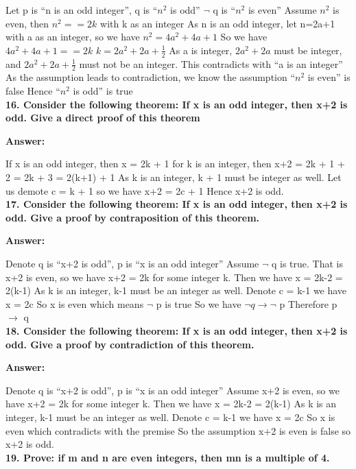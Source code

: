 \documentclass{article}
\begin{document}
\begin{large}
Let p is ``n is an odd integer'', q is ``$n^2$ is odd''
$\lnot$ q is ``$n^2$ is even''
Assume $n^2$ is even, then $n^2 == 2k$ with k as an integer
As n is an odd integer, let n=2a+1 with a as an integer, so we have $n^2 = 4a^2 + 4a + 1$
So we have $4a^2 + 4a + 1 == 2k$
$k = 2a^2 + 2a + \frac{1}{2}$
As a is integer, $2a^2 + 2a$ must be integer, and $2a^2 + 2a + \frac{1}{2}$ must not be an integer.
This contradicts with ``a is an integer''
As the assumption leads to contradiction, we know the assumption ``$n^2$ is even'' is false
Hence ``$n^2$ is odd'' is true\\

\textbf{16. Consider the following theorem: If x is an odd integer, then x+2 is odd. Give a direct proof of this theorem}

\textbf{Answer:}

If x is an odd integer, then x = 2k + 1 for k is an integer, then x+2 = 2k + 1 + 2 = 2k + 3 = 2(k+1) + 1
As k is an integer, k + 1 must be integer as well. Let us demote c = k + 1 so we have x+2 = 2c + 1
Hence x+2 is odd.\\

\textbf{17. Consider the following theorem: If x is an odd integer, then x+2 is odd. Give a proof by contraposition of this theorem.}

\textbf{Answer:}

Denote q is ``x+2 is odd'', p is ``x is an odd integer''
Assume $\lnot$ q is true. That is x+2 is even, so we have x+2 = 2k for some integer k.
Then we have x = 2k-2 = 2(k-1)
As k is an integer, k-1 must be an integer as well. Denote c = k-1 we have x = 2c
So x is even which means $\lnot$ p is true
So we have $\lnot q \to \lnot$ p
Therefore p $\to$ q\\

\textbf{18. Consider the following theorem: If x is an odd integer, then x+2 is odd. Give a proof by contradiction of this theorem.}

\textbf{Answer:}

Denote q is ``x+2 is odd'', p is ``x is an odd integer''
Assume x+2 is even, so we have x+2 = 2k for some integer k.
Then we have x = 2k-2 = 2(k-1)
As k is an integer, k-1 must be an integer as well. Denote c = k-1 we have x = 2c
So x is even which contradicts with the premise
So the assumption x+2 is even is false so x+2 is odd.\\

\textbf{19. Prove: if m and n are even integers, then mn is a multiple of 4.}


\end{large}
\end{document}
